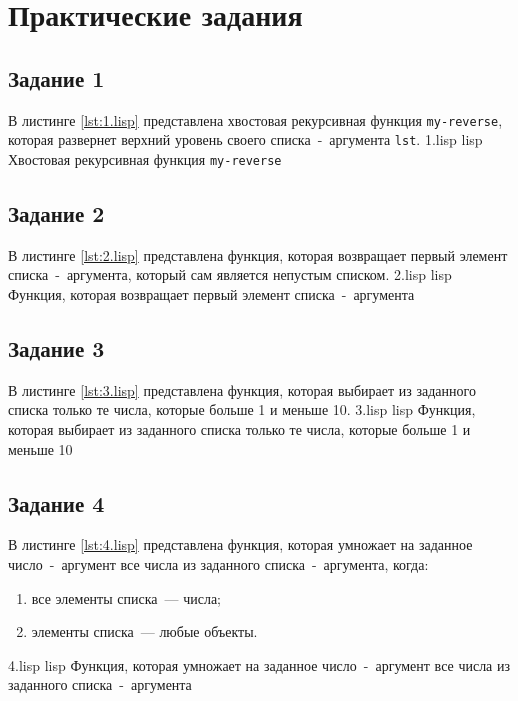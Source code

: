 \chapter{Практические задания}

\section{Задание 1}

В листинге \ref{lst:1.lisp} представлена хвостовая рекурсивная функция \texttt{my-reverse}, которая развернет верхний уровень своего списка~-~аргумента \texttt{lst}.
	{1.lisp}
	{lisp}
	{Хвостовая рекурсивная функция \texttt{my-reverse}}

\section{Задание 2}

В листинге \ref{lst:2.lisp} представлена функция, которая возвращает первый элемент списка~-~аргумента, который сам является непустым списком.
	{2.lisp}
	{lisp}
	{Функция, которая возвращает первый элемент списка~-~аргумента}
	
\clearpage

\section{Задание 3}

В листинге \ref{lst:3.lisp} представлена функция, которая выбирает из заданного списка только те числа, которые больше 1 и меньше 10.
	{3.lisp}
	{lisp}
	{Функция, которая выбирает из заданного списка только те числа, которые больше 1 и меньше 10}

\section{Задание 4}

В листинге \ref{lst:4.lisp} представлена функция, которая умножает на заданное число~-~аргумент все числа из заданного списка~-~аргумента, когда:
\begin{enumerate}
	\item все элементы списка~--- числа;
	\item элементы списка~--- любые объекты.
\end{enumerate}
	{4.lisp}
	{lisp}
	{Функция, которая умножает на заданное число~-~аргумент все числа из заданного списка~-~аргумента}

